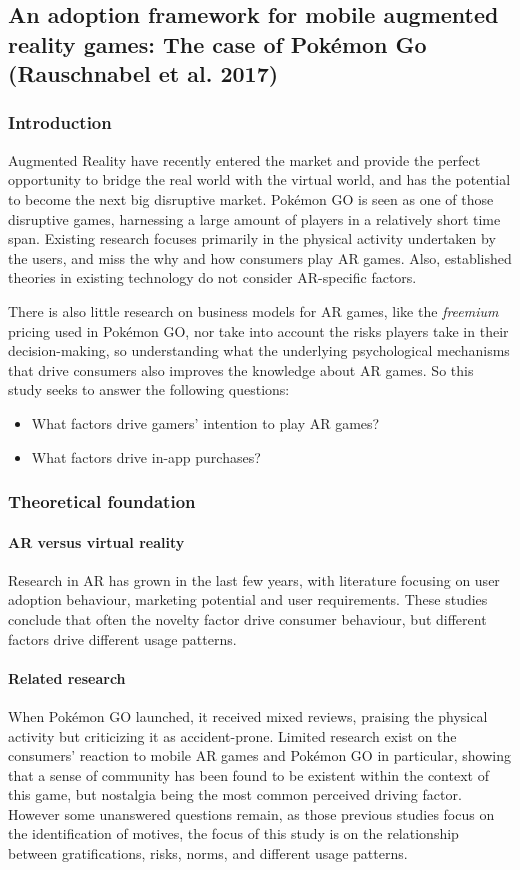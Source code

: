 \documentclass[runningheads]{llncs}
\begin{document}
\subsection{An adoption framework for mobile augmented reality games: The case of Pokémon Go (Rauschnabel et al. 2017)}

\subsubsection{Introduction}
\par Augmented Reality have recently entered the market and provide the perfect opportunity to bridge the real world with the virtual world, and has the potential to become the next big disruptive market. Pokémon GO is seen as one of those disruptive games, harnessing a large amount of players in a relatively short time span. Existing research focuses primarily in the physical activity undertaken by the users, and miss the why and how consumers play AR games. Also, established theories in existing technology do not consider AR-specific factors.
\par There is also little research on business models for AR games, like the \textit{freemium} pricing used in Pokémon GO, nor take into account the risks players take in their decision-making, so understanding what the underlying psychological mechanisms that drive consumers also improves the knowledge about AR games. So this study seeks to answer the following questions:
\begin{itemize}
    \item What factors drive gamers' intention to play AR games?
    \item What factors drive in-app purchases?
\end{itemize}

\subsubsection{Theoretical foundation}
\paragraph{AR versus virtual reality} Research in AR has grown in the last few years, with literature focusing on user adoption behaviour, marketing potential and user requirements. These studies conclude that often the novelty factor drive consumer behaviour, but different factors drive different usage patterns.
\paragraph{Related research} When Pokémon GO launched, it received mixed reviews, praising the physical activity but criticizing it as accident-prone. Limited research exist on the consumers' reaction to mobile AR games and Pokémon GO in particular, showing that a sense of community has been found to be existent within the context of this game, but nostalgia being the most common perceived driving factor. However some unanswered questions remain, as those previous studies focus on the identification of motives, the focus of this study is on the
relationship between gratifications, risks, norms, and different usage patterns.
\end{document}

